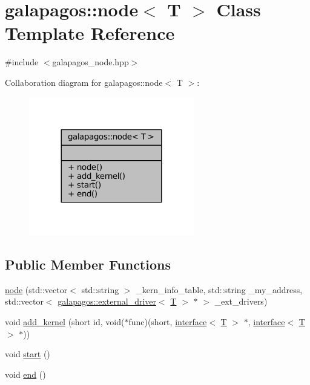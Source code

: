 \hypertarget{classgalapagos_1_1node}{}\section{galapagos\+:\+:node$<$ T $>$ Class Template Reference}
\label{classgalapagos_1_1node}


{\ttfamily \#include $<$galapagos\+\_\+node.\+hpp$>$}



Collaboration diagram for galapagos\+:\+:node$<$ T $>$\+:
\nopagebreak
\begin{figure}[H]
\begin{center}
\leavevmode
\includegraphics[width=204pt]{classgalapagos_1_1node__coll__graph}
\end{center}
\end{figure}
\subsection*{Public Member Functions}
\begin{DoxyCompactItemize}
\item 
\hyperlink{classgalapagos_1_1node_a7cb6e9d7b42bce3052214e7256408bfd}{node} (std\+::vector$<$ std\+::string $>$ \+\_\+kern\+\_\+info\+\_\+table, std\+::string \+\_\+my\+\_\+address, std\+::vector$<$ \hyperlink{classgalapagos_1_1external__driver}{galapagos\+::external\+\_\+driver}$<$ \hyperlink{test_8cpp_a0658ceffa730c765d449bb3d21871b5f}{T} $>$ $\ast$ $>$ \+\_\+ext\+\_\+drivers)
\item 
void \hyperlink{classgalapagos_1_1node_a085cc57860935c281c396d9b03ee0e41}{add\+\_\+kernel} (short id, void($\ast$func)(short, \hyperlink{classgalapagos_1_1interface}{interface}$<$ \hyperlink{test_8cpp_a0658ceffa730c765d449bb3d21871b5f}{T} $>$ $\ast$, \hyperlink{classgalapagos_1_1interface}{interface}$<$ \hyperlink{test_8cpp_a0658ceffa730c765d449bb3d21871b5f}{T} $>$ $\ast$))
\item 
void \hyperlink{classgalapagos_1_1node_a867d21a2e0f0c83cada0cc2ac8ee4d00}{start} ()
\item 
void \hyperlink{classgalapagos_1_1node_a919af41e5ac382cea85899fbc9084bb3}{end} ()
\end{DoxyCompactItemize}


